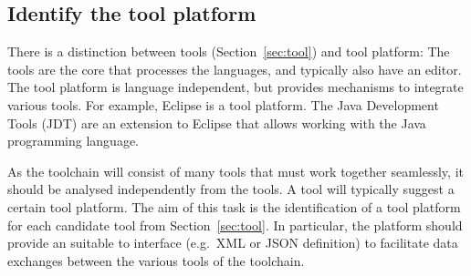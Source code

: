 \documentclass{template/openetcs_article}
\begin{document}



\subsection{Identify the tool platform}
\label{sec:tool_platform}

There is a distinction between tools (Section~\ref{sec:tool}) and tool
platform: The tools are the core that processes the languages, and
typically also have an editor. The tool platform is language
independent, but provides mechanisms to integrate various tools. For
example, Eclipse is a tool platform. The Java Development Tools (JDT)
are an extension to Eclipse that allows working with the Java
programming language.

As the toolchain will consist of many tools that must work together
seamlessly, it should be analysed independently from the tools. A tool
will typically suggest a certain tool platform. The aim of this task
is the identification of a tool platform for each candidate tool from
Section~\ref{sec:tool}. In particular, the platform should provide an
suitable to interface (e.g.~XML or JSON definition) to facilitate data
exchanges between the various tools of the toolchain.
\end{document}
